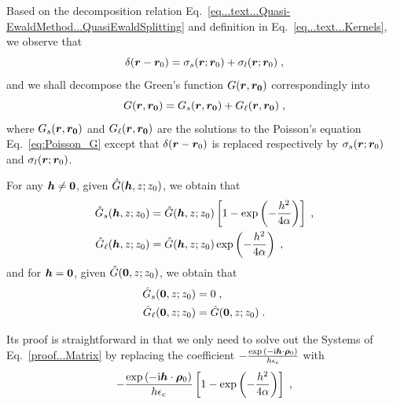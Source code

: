Based on the decomposition relation Eq.~\eqref{eq...text...Quasi-EwaldMethod...QuasiEwaldSplitting} and definition in Eq.~\eqref{eq...text...Kernels}, we observe that 
\begin{equation}%
   \delta(\V{r}-\V{r}_0)=\sigma_s  (\V{r};\V{r}_0)+\sigma_l  (\V{r};\V{r}_0)\;,
\end{equation}
and we  shall decompose the Green's function  $ G(\boldsymbol{r}, \boldsymbol{r_0})$ correspondingly into
\begin{equation}
    G(\boldsymbol{r}, \boldsymbol{r_0})= G_s(\boldsymbol{r}, \boldsymbol{r_0})+  G_\ell(\boldsymbol{r}, \boldsymbol{r_0})\;,
\end{equation}
where $ G_s(\boldsymbol{r}, \boldsymbol{r_0})$ and $  G_\ell(\boldsymbol{r}, \boldsymbol{r_0})$ are the solutions to the Poisson's equation Eq.~\eqref{eq:Poisson_G} except that $\delta(\boldsymbol{r}-\boldsymbol{r}_0)$ is replaced respectively by $\sigma_s  (\boldsymbol{r};\boldsymbol{r}_0)$ and $\sigma_l  (\boldsymbol{r};\boldsymbol{r}_0)$.
\begin{corollary}
For any $\boldsymbol{h}\neq \bm{0}$, given     $\hat{G}(\boldsymbol{h}, z; z_0)$, we obtain that  
    \begin{align*}
        \hat{G}_s(\boldsymbol{h}, z; z_0)&=\hat{G}(\boldsymbol{h}, z; z_0)\left[1-\exp\left(-\frac{h^2}{4\alpha}\right)\right]\;,\\
        \hat{G}_\ell(\boldsymbol{h}, z; z_0)&=\hat{G}(\boldsymbol{h}, z; z_0)\exp\left(-\frac{h^2}{4\alpha}\right)\;,
    \end{align*} 
    and for  $\boldsymbol{h}=\bm{0}$, given     $\hat{G}(\bm{0}, z; z_0)$, we obtain that  
        \begin{align*}
        \hat{G}_s(\bm{0}, z; z_0)&=0\;,\\
        \hat{G}_\ell(\bm{0}, z; z_0)&=\hat{G}(\bm{0}, z; z_0)\;.
    \end{align*} 
\end{corollary}
Its proof is straightforward in that we only need to solve out the Systems of Eq.~\eqref{proof...Matrix} by replacing  the coefficient $-\frac{\exp{(-\mathrm{i} \boldsymbol{h} \cdot \boldsymbol{\rho}_0)}}{h\epsilon_{\mathrm{c}}}$ with  
\begin{equation*}
    -\frac{\exp{(-\mathrm{i} \boldsymbol{h} \cdot \boldsymbol{\rho}_0)}}{h\epsilon_{\mathrm{c}}}\left[1-\exp\left(-\frac{h^2}{4\alpha}\right)\right]\;,
\end{equation*}
